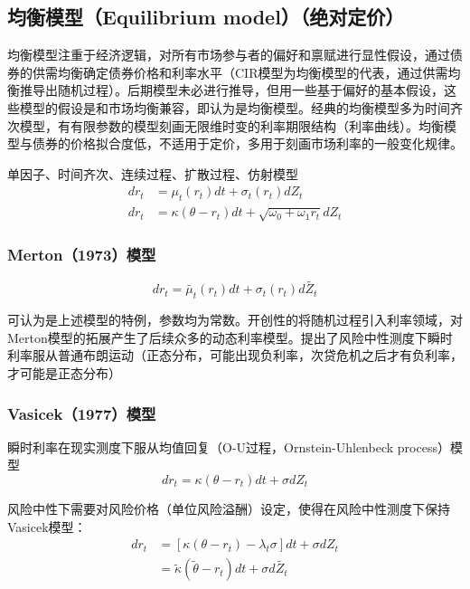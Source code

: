 \documentclass[11pt]{article}
\begin{document}
\subsection{均衡模型（Equilibrium model）（绝对定价）}

均衡模型注重于经济逻辑，对所有市场参与者的偏好和禀赋进行显性假设，通过债券的供需均衡确定债券价格和利率水平（CIR模型为均衡模型的代表，通过供需均衡推导出随机过程）。后期模型未必进行推导，但用一些基于偏好的基本假设，这些模型的假设是和市场均衡兼容，即认为是均衡模型。经典的均衡模型多为时间齐次模型，有有限参数的模型刻画无限维时变的利率期限结构（利率曲线）。均衡模型与债券的价格拟合度低，不适用于定价，多用于刻画市场利率的一般变化规律。

单因子、时间齐次、连续过程、扩散过程、仿射模型
\begin{align*}
	dr_t &= \mu_t(r_t)dt+\sigma_t(r_t)dZ_t \\
	dr_t &= \kappa(\theta-r_t)dt+\sqrt{\omega_0+\omega_1 r_t}dZ_t
\end{align*}

\subsubsection{Merton（1973）模型}

\noindent
\begin{equation*}
	dr_t = \tilde{\mu_t}(r_t)dt+\sigma_t(r_t)d\tilde{Z_t}
\end{equation*}

可认为是上述模型的特例，参数均为常数。开创性的将随机过程引入利率领域，对Merton模型的拓展产生了后续众多的动态利率模型。提出了风险中性测度下瞬时利率服从普通布朗运动（正态分布，可能出现负利率，次贷危机之后才有负利率，才可能是正态分布）

\subsubsection{Vasicek（1977）模型}

瞬时利率在现实测度下服从均值回复（O-U过程，Ornstein-Uhlenbeck process）模型
\begin{equation*}
	dr_t = \kappa(\theta-r_t)dt+\sigma dZ_t
\end{equation*}

风险中性下需要对风险价格（单位风险溢酬）设定，使得在风险中性测度下保持Vasicek模型：
\begin{align*}
	dr_t &= [\kappa(\theta-r_t)-\lambda_t\sigma]dt+\sigma dZ_t \\
	&= \tilde{\kappa}(\tilde{\theta}-r_t)dt+\sigma d\tilde{Z_t}
\end{align*}
\end{document}
